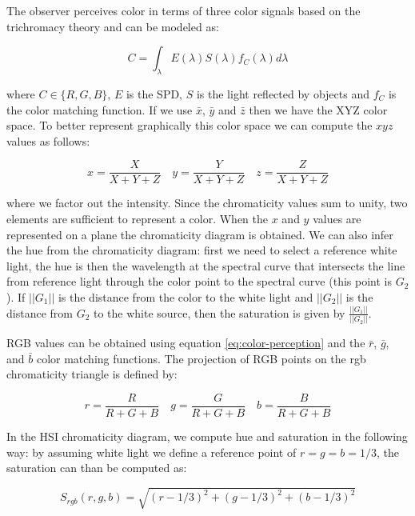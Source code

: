 \documentclass[a4paper,twocolumn]{article}
\begin{document}
The observer perceives color in terms of three color signals based on the
trichromacy theory and can be modeled as:

\begin{equation} \label{eq:color-perception}
C = \int_{\lambda} E(\lambda) S(\lambda) f_C(\lambda) d\lambda
\end{equation}

where $C \in \{R, G, B\}$, $E$ is the SPD, $S$ is the light reflected by objects
and $f_C$ is the color matching function. If we use $\bar{x}$, $\bar{y}$ and
$\bar{z}$ then we have the XYZ color space. To better represent graphically this
color space we can compute the $xyz$ values as follows:

\begin{equation}
x = \frac{X}{X + Y + Z} \quad y = \frac{Y}{X + Y + Z} \quad z = \frac{Z}{X + Y + Z}
\end{equation}

where we factor out the intensity. Since the chromaticity values sum to unity,
two elements are sufficient to represent a color. When the $x$ and $y$ values
are represented on a plane the chromaticity diagram is obtained. We can also
infer the hue from the chromaticity diagram: first we need to select a reference
white light, the hue is then the wavelength at the spectral curve that
intersects the line from reference light through the color point to the spectral
curve (this point is $G_2$). If $||G_1||$ is the distance from the color to the
white light and $||G_2||$ is the distance from $G_2$ to the white source, then
the saturation is given by $\frac{||G_1||}{||G_2||}$.

RGB values can be obtained using equation \ref{eq:color-perception} and the
$\bar{r}$, $\bar{g}$, and $\bar{b}$ color matching functions. The projection of
RGB points on the rgb chromaticity triangle is defined by:

\begin{equation}
r = \frac{R}{R + G + B} \quad g = \frac{G}{R + G + B} \quad b = \frac{B}{R + G + B}
\end{equation}

In the HSI chromaticity diagram, we compute hue and saturation in the following
way: by assuming white light we define a reference point of $r = g = b = 1/3$,
the saturation can than be computed as:

\begin{equation}
S_{rgb}(r, g, b) = \sqrt{(r - 1/3)^2 + (g - 1/3)^2 + (b - 1/3)^2}
\end{equation}
\end{document}
